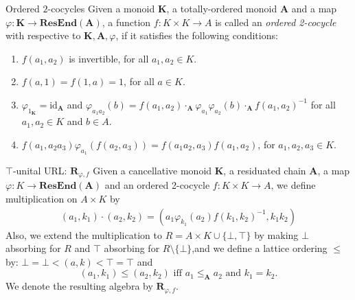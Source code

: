 \documentclass[professionalfont, 10pt]{beamer} %
\theoremstyle{plain}
\theoremstyle{definition}
\newcommand{\m}[1]{{\mathbf {#1} }}
\begin{document}
\begin{frame}{Ordered $2$-cocycles}
    Given a monoid $\mathbf{K}$, a totally-ordered monoid $\mathbf{A}$ and a map $\varphi: \mathbf{K} \rightarrow \m {ResEnd}(\mathbf{A})$, a function $f: K \times K \rightarrow A$ is called an \emph{ordered 2-cocycle} with respective to $\m K, \m A, \varphi$, if it satisfies the following conditions:
    \begin{enumerate}
    \item $f(a_1, a_2)$ is invertible, for all $a_1, a_2 \in K$.

    \item $f(a, 1) = f(1,a)= 1$, for all $a \in K$.

    \item $\varphi_{1_{\mathbf{K}}} = \text{id}_{\mathbf{A}}$ and $\varphi_{a_1 a_2} (b) = f(a_1, a_2) \cdot_{\mathbf{A}} \varphi_{a_1} \varphi_{a_2} (b) \cdot_{\mathbf{A}} f(a_1, a_2)^{-1}$ for all $a_1, a_2 \in K$ and $b \in A$.
    
    \item $f(a_1, a_2 a_3) \varphi_{a_1}(f(a_2, a_3)) = f(a_1 a_2, a_3) f(a_1, a_2)$, for $a_1, a_2, a_3 \in K$.
    \end{enumerate}
\end{frame}

\begin{frame}{$\top$-unital URL: $\m R_{\varphi, f}$}
    Given a cancellative monoid $\mathbf{K}$, a residuated chain $\mathbf{A}$, a map $\varphi: K \rightarrow \m {ResEnd}(\mathbf{A})$ and an ordered 2-cocycle $f: K \times K \rightarrow A$, we  define multiplication on $A \times K$ by 
    \begin{align*}
    (a_1, k_1) \cdot (a_2, k_2) = (a_1 \varphi_{k_1} (a_2) f(k_1, k_2)^{-1}, k_1 k_2)
    \end{align*}
    Also, we extend the multiplication to $R = A \times K \cup \{\bot, \top\}$ by making $\bot$ absorbing for $R$ and $\top$ absorbing for $R \setminus\{\bot\}$,and we define a lattice ordering $\leq$ by: $\bot = \bot < (a, k) < \top = \top$ and
    \[
    (a_1, k_1) \leq (a_2, k_2) \text{ iff } a_1 \leq_{\mathbf{A}} a_2 \text{ and } k_1 = k_2.
    \]
    We denote the resulting algebra by $\mathbf{R}_{\varphi, f}$.
\end{frame}
\end{document}
